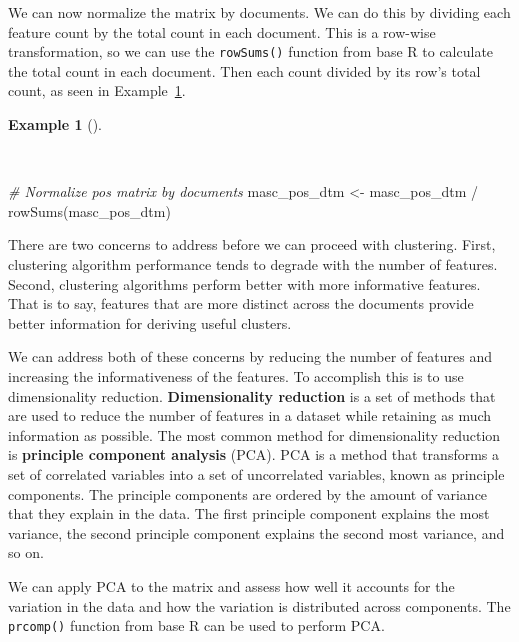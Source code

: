 \documentclass[
  letterpaper,
  krantz1]{latex/krantz-mod}
\newenvironment{Shaded}{\begin{snugshade}}{\end{snugshade}}
\newcommand{\CommentTok}[1]{\textcolor[rgb]{0.00,0.00,0.00}{\textit{#1}}}
\newcommand{\FunctionTok}[1]{\textcolor[rgb]{0.00,0.00,0.00}{#1}}
\newcommand{\NormalTok}[1]{\textcolor[rgb]{0.00,0.00,0.00}{#1}}
\newcommand{\OtherTok}[1]{\textcolor[rgb]{0.00,0.00,0.00}{#1}}
\newcommand{\SpecialCharTok}[1]{\textcolor[rgb]{0.00,0.00,0.00}{#1}}
\theoremstyle{definition}
\newtheorem{example}{Example}[chapter]
\theoremstyle{definition}
\theoremstyle{remark}
\begin{document}
We can now normalize the matrix by documents. We can do this by dividing
each feature count by the total count in each document. This is a
row-wise transformation, so we can use the \texttt{rowSums()} function
from base R to calculate the total count in each document. Then each
count divided by its row's total count, as seen in
Example~\ref{exm-explore-masc-dtms-normalized}.

\begin{example}[]\protect\hypertarget{exm-explore-masc-dtms-normalized}{}\label{exm-explore-masc-dtms-normalized}

~

\begin{Shaded}
\begin{Highlighting}[numbers=left,,]
\CommentTok{\# Normalize pos matrix by documents}
\NormalTok{masc\_pos\_dtm }\OtherTok{\textless{}{-}}
\NormalTok{  masc\_pos\_dtm }\SpecialCharTok{/} \FunctionTok{rowSums}\NormalTok{(masc\_pos\_dtm)}
\end{Highlighting}
\end{Shaded}

\end{example}

There are two concerns to address before we can proceed with clustering.
First, clustering algorithm performance tends to degrade with the number
of features. Second, clustering algorithms perform better with more
informative features. That is to say, features that are more distinct
across the documents provide better information for deriving useful
clusters.

We can address both of these concerns by reducing the number of features
and increasing the informativeness of the features. To accomplish this
is to use dimensionality reduction. \textbf{Dimensionality reduction} is
a set of methods that are used to reduce the number of features in a
dataset while retaining as much information as possible. The most common
method for dimensionality reduction is \textbf{principle component
analysis} (PCA). PCA is a method that transforms a set of correlated
variables into a set of uncorrelated variables, known as principle
components. The principle components are ordered by the amount of
variance that they explain in the data. The first principle component
explains the most variance, the second principle component explains the
second most variance, and so on.

We can apply PCA to the matrix and assess how well it accounts for the
variation in the data and how the variation is distributed across
components. The \texttt{prcomp()} function from base R can be used to
perform PCA.
\end{document}
